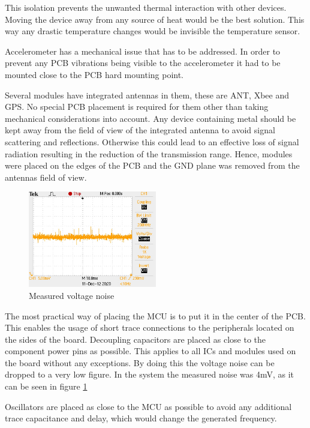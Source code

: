 This isolation prevents the unwanted thermal interaction with other devices. Moving the device away from any source of heat would be the best solution. This way any drastic temperature changes would be invisible the temperature sensor.

Accelerometer has a mechanical issue that has to be addressed. In order to prevent any PCB vibrations being visible to the accelerometer it had to be mounted close to the PCB hard mounting point. 

Several modules have integrated antennas in them, these are ANT, Xbee and GPS. No special PCB placement is required for them other than taking mechanical considerations into account. Any device containing metal should be kept away from the field of view of the integrated antenna to avoid signal scattering and reflections. Otherwise this could lead to an effective loss of signal radiation resulting in the reduction of the transmission range. Hence, modules were placed on the edges of the PCB and the GND plane was removed from the antennas field of view. 

\begin{figure}
\centering
\includegraphics[width=0.5\textwidth]{Images/voltage_noise.jpg}
\caption{Measured voltage noise}
\label{fig:voltage_noise}
\end{figure}

The most practical way of placing the MCU is to put it in the center of the PCB. This enables the usage of short trace connections to the peripherals located on the sides of the board. Decoupling capacitors are placed as close to the component power pins as possible. This applies to all ICs and modules used on the board without any exceptions. By doing this the voltage noise can be dropped to a very low figure. In the system the measured noise was 4mV, as it can be seen in figure \ref{fig:voltage_noise}

Oscillators are placed as close to the MCU as possible to avoid any additional trace capacitance and delay, which would change the generated frequency. 


